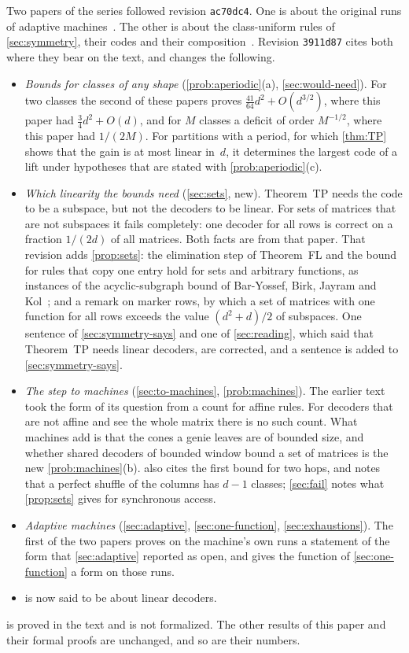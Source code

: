Two papers of the series followed revision \texttt{ac70dc4}. One is about the original runs of adaptive
machines~\cite{AdaptiveTransfer2026}. The other is about the class-uniform rules of \cref{sec:symmetry}, their
codes and their composition~\cite{SharedDecoders2026}. Revision \texttt{3911d87} cites both where they bear on the text,
and changes the following.
\begin{itemize}[leftmargin=1.5em]
\item \emph{Bounds for classes of any shape} (\cref{prob:aperiodic}(a), \cref{sec:would-need}). For two classes the
second of these papers proves $\tfrac{41}{64}d^2+O(d^{3/2})$, where this paper had $\tfrac34d^2+O(d)$, and for $M$
classes a deficit of order $M^{-1/2}$, where this paper had $1/(2M)$. For partitions with a period, for which
\cref{thm:TP} shows that the gain is at most linear in~$d$, it determines the largest code of a lift under
hypotheses that are stated with \cref{prob:aperiodic}(c).
\item \emph{Which linearity the bounds need} (\cref{sec:sets}, new). Theorem~TP needs the code to be a subspace, but
not the decoders to be linear. For sets of matrices that are not subspaces it fails completely: one decoder for all
rows is correct on a fraction $1/(2d)$ of all matrices. Both facts are from that paper. That revision adds
\cref{prop:sets}: the elimination step of Theorem~FL and the bound for rules that copy one entry hold for sets and
arbitrary functions, as instances of the acyclic-subgraph bound of Bar-Yossef, Birk, Jayram and
Kol~\cite{BBJK2011}; and a remark on marker rows, by which a set of matrices with one function for all rows exceeds
the value $(d^2+d)/2$ of subspaces. One sentence of \cref{sec:symmetry-says} and one of \cref{sec:reading}, which said that
Theorem~TP needs linear decoders, are corrected, and a sentence is added to \cref{sec:symmetry-says}.
\item \emph{The step to machines} (\cref{sec:to-machines}, \cref{prob:machines}). The earlier text took the form of
its question from a count for affine rules. For decoders that are not affine and see the whole matrix there is no such
count. What machines add is that the cones a genie leaves are of bounded size, and whether shared decoders of
bounded window bound a set of matrices is the new \cref{prob:machines}(b).  also cites the
first bound for two hops, and notes that a perfect shuffle of the columns has $d-1$ classes; \cref{sec:fail} notes
what \cref{prop:sets} gives for synchronous access.
\item \emph{Adaptive machines} (\cref{sec:adaptive}, \cref{sec:one-function}, \cref{sec:exhaustions}). The first of
the two papers proves on the machine's own runs a statement of the form that \cref{sec:adaptive} reported as open,
and gives the function of \cref{sec:one-function} a form on those runs.
\item {} is now said to be about linear decoders.
\end{itemize}
 is proved in the text and is not formalized. The other results of this paper and their formal proofs
are unchanged, and so are their numbers.

